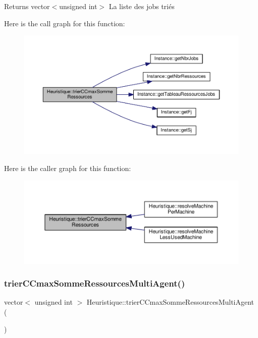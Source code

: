 \begin{DoxyReturn}{Returns}
vector$<$unsigned int$>$ La liste des jobs triés 
\end{DoxyReturn}
Here is the call graph for this function\+:
\nopagebreak
\begin{figure}[H]
\begin{center}
\leavevmode
\includegraphics[width=350pt]{classHeuristique_a38c390423fc2b190da599148ca879cd6_cgraph}
\end{center}
\end{figure}
Here is the caller graph for this function\+:
\nopagebreak
\begin{figure}[H]
\begin{center}
\leavevmode
\includegraphics[width=350pt]{classHeuristique_a38c390423fc2b190da599148ca879cd6_icgraph}
\end{center}
\end{figure}
\mbox{\label{classHeuristique_aca0409bb9bab82ae4d47c13f3838d04d}} 
\subsubsection{\texorpdfstring{trier\+C\+Cmax\+Somme\+Ressources\+Multi\+Agent()}{trierCCmaxSommeRessourcesMultiAgent()}}
{\footnotesize\ttfamily vector$<$ unsigned int $>$ Heuristique\+::trier\+C\+Cmax\+Somme\+Ressources\+Multi\+Agent (\begin{DoxyParamCaption}{ }\end{DoxyParamCaption})}



